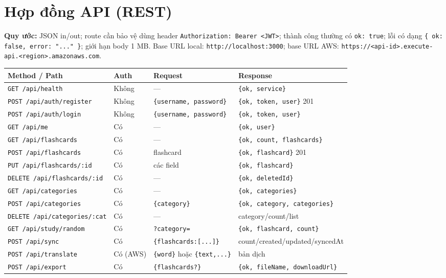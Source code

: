 \documentclass[11pt,a4paper]{article}
\newcommand{\code}[1]{\texttt{#1}}
\begin{document}
\section{Hợp đồng API (REST)}

\textbf{Quy ước:} JSON in/out; route cần bảo vệ dùng header \code{Authorization: Bearer <JWT>};
thành công thường có \code{ok: true}; lỗi có dạng \code{\{ ok: false, error: "..." \}}; giới hạn
body 1 MB. Base URL local: \code{http://localhost:3000}; base URL AWS:
\code{https://<api-id>.execute-api.<region>.amazonaws.com}.

\begin{longtable}{@{}p{4.6cm} p{1.2cm} p{4.4cm} p{4.4cm}@{}}
\toprule
\textbf{Method / Path} & \textbf{Auth} & \textbf{Request} & \textbf{Response} \\
\midrule
\endhead
\code{GET /api/health} & Không & --- & \code{\{ok, service\}} \\
\code{POST /api/auth/register} & Không & \code{\{username, password\}} & \code{\{ok, token, user\}} 201 \\
\code{POST /api/auth/login} & Không & \code{\{username, password\}} & \code{\{ok, token, user\}} \\
\code{GET /api/me} & Có & --- & \code{\{ok, user\}} \\
\code{GET /api/flashcards} & Có & --- & \code{\{ok, count, flashcards\}} \\
\code{POST /api/flashcards} & Có & flashcard & \code{\{ok, flashcard\}} 201 \\
\code{PUT /api/flashcards/:id} & Có & các field & \code{\{ok, flashcard\}} \\
\code{DELETE /api/flashcards/:id} & Có & --- & \code{\{ok, deletedId\}} \\
\code{GET /api/categories} & Có & --- & \code{\{ok, categories\}} \\
\code{POST /api/categories} & Có & \code{\{category\}} & \code{\{ok, category, categories\}} \\
\code{DELETE /api/categories/:cat} & Có & --- & category/count/list \\
\code{GET /api/study/random} & Có & \code{?category=} & \code{\{ok, flashcard, count\}} \\
\code{POST /api/sync} & Có & \code{\{flashcards:[...]\}} & count/created/updated/syncedAt \\
\code{POST /api/translate} & Có (AWS) & \code{\{word\}} hoặc \code{\{text,...\}} & bản dịch \\
\code{POST /api/export} & Có & \code{\{flashcards?\}} & \code{\{ok, fileName, downloadUrl\}} \\
\bottomrule
\end{longtable}
\end{document}
